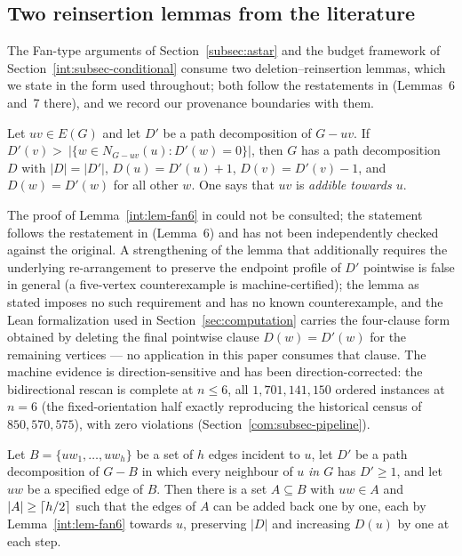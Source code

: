 \subsection{Two reinsertion lemmas from the literature}\label{int:subsec-fanlemmas}

The Fan-type arguments of Section~\ref{subsec:astar} and the budget framework of
Section~\ref{int:subsec-conditional} consume two deletion--reinsertion lemmas, which we
state in the form used throughout; both follow the restatements in \cite{BS21}
(Lemmas~6 and~7 there), and we record our provenance boundaries with them.

\begin{lemma}\label{int:lem-fan6}
Let $uv\in E(G)$ and let $D'$ be a path decomposition of $G-uv$. If
$D'(v)>\ |\{w\in N_{G-uv}(u) : D'(w)=0\}|$, then $G$ has a path decomposition $D$ with
$|D|=|D'|$, $D(u)=D'(u)+1$, $D(v)=D'(v)-1$, and $D(w)=D'(w)$ for all other $w$. One says that
$uv$ is \emph{addible towards $u$}.
\end{lemma}

\begin{remark}\label{int:rem-fan6}
The proof of Lemma~\ref{int:lem-fan6} in \cite{Fan05} could not be consulted; the statement
follows the restatement in \cite{BS21} (Lemma~6) and has not been independently checked
against the original. A strengthening of the lemma that additionally requires the
underlying re-arrangement to preserve the endpoint profile of $D'$ pointwise is false in
general (a five-vertex counterexample is machine-certified); the lemma as stated imposes no
such requirement and has no known counterexample, and the Lean formalization used in
Section~\ref{sec:computation} carries the four-clause form obtained by deleting the final
pointwise clause $D(w)=D'(w)$ for the remaining vertices --- no application in this paper
consumes that clause. The machine evidence is direction-sensitive and has been
direction-corrected: the bidirectional rescan is complete at $n\le6$, all
$1{,}701{,}141{,}150$ ordered instances at $n=6$ (the fixed-orientation half exactly
reproducing the historical census of $850{,}570{,}575$), with zero violations
(Section~\ref{com:subsec-pipeline}).
\end{remark}

\begin{lemma}\label{int:lem-fan7}
Let $B=\{uw_1,\dots,uw_h\}$ be a set of $h$ edges incident to $u$, let $D'$ be a path
decomposition of $G-B$ in which every neighbour of $u$ \emph{in $G$} has $D'\ge 1$, and let
$uw$ be a specified edge of $B$. Then there is a set $A\subseteq B$ with $uw\in A$ and
$|A|\ge\left\lceil h/2 \right\rceil$ such that the edges of $A$ can be added back one by one, each by
Lemma~\ref{int:lem-fan6} towards $u$, preserving $|D|$ and increasing $D(u)$ by one at each
step.
\end{lemma}

